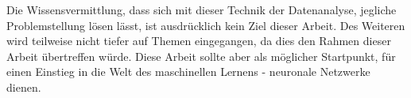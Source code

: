 \noindent
Die Wissensvermittlung, dass sich mit dieser Technik der Datenanalyse, jegliche Problemstellung lösen lässt, ist ausdrücklich kein Ziel dieser Arbeit. 
Des Weiteren wird teilweise nicht tiefer auf Themen eingegangen, da dies den Rahmen dieser Arbeit übertreffen würde. 
Diese Arbeit sollte aber als möglicher Startpunkt, für einen Einstieg in die Welt des maschinellen Lernens - neuronale Netzwerke dienen. 






